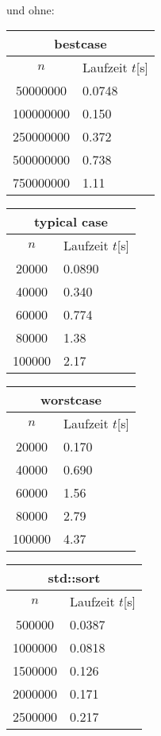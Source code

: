 \\und ohne:\\
\begin{tabularx}{0.24\textwidth}{|c|X|}
\hline
\multicolumn{2}{|c|}{bestcase}\\
\hline
$n$ & Laufzeit $t$[s]\\
\hline
 50000000 & 0.0748 \\
\hline
 100000000 & 0.150 \\
\hline
 250000000 & 0.372 \\
\hline
 500000000 & 0.738 \\
\hline
 750000000 & 1.11 \\
\hline
\end{tabularx}
\begin{tabularx}{0.24\textwidth}{|c|X|}
\hline
\multicolumn{2}{|c|}{typical case}\\
\hline
$n$ & Laufzeit $t$[s]\\
\hline
 20000 & 0.0890 \\
\hline
 40000 & 0.340 \\
\hline
 60000 & 0.774 \\
\hline
 80000 & 1.38 \\
\hline
 100000 & 2.17 \\
\hline
\end{tabularx}
\begin{tabularx}{0.24\textwidth}{|c|X|}
\hline
\multicolumn{2}{|c|}{worstcase}\\
\hline
$n$ & Laufzeit $t$[s]\\
\hline
 20000 & 0.170 \\
\hline
 40000 & 0.690 \\
\hline
 60000 & 1.56 \\
\hline
 80000 & 2.79 \\
\hline
 100000 & 4.37 \\
\hline
\end{tabularx}
\begin{tabularx}{0.24\textwidth}{|c|X|}
\hline
\multicolumn{2}{|c|}{std::sort}\\
\hline
$n$ & Laufzeit $t$[s]\\
\hline
 500000 & 0.0387\\
\hline
 1000000 & 0.0818 \\
\hline
 1500000 & 0.126 \\
\hline
 2000000 & 0.171 \\
\hline
 2500000 & 0.217 \\
\hline
\end{tabularx}

